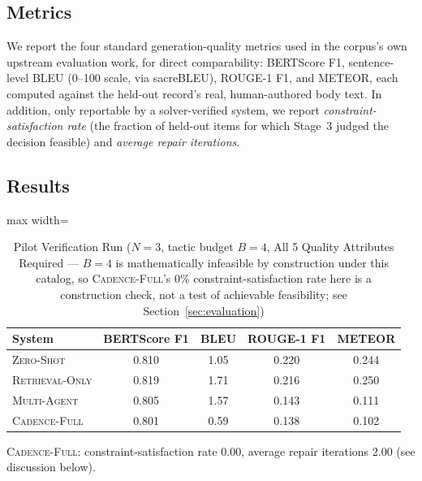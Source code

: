 \documentclass[preprint,12pt,authoryear]{elsarticle}
\newcommand{\sysZS}{\textsc{Zero-Shot}}
\newcommand{\sysRO}{\textsc{Retrieval-Only}}
\newcommand{\sysMA}{\textsc{Multi-Agent}}
\newcommand{\sysFull}{\textsc{Cadence-Full}}
\renewcommand{\_}{\textunderscore\allowbreak{}}
\begin{document}
\subsection{Metrics}

We report the four standard generation-quality metrics used in the corpus's own upstream evaluation work, for direct comparability: BERTScore F1, sentence-level BLEU (0--100 scale, via sacreBLEU), ROUGE-1 F1, and METEOR, each computed against the held-out record's real, human-authored body text. In addition, only reportable by a solver-verified system, we report \emph{constraint-satisfaction rate} (the fraction of held-out items for which Stage~3 judged the decision feasible) and \emph{average repair iterations}.

\subsection{Results}

\begin{table}[!htbp]
\caption{Pilot Verification Run ($N=3$, tactic budget $B=4$, All 5 Quality Attributes Required --- $B=4$ is mathematically infeasible by construction under this catalog, so \sysFull{}'s 0\% constraint-satisfaction rate here is a construction check, not a test of achievable feasibility; see Section~\ref{sec:evaluation})\label{tab:pilot}}
\centering
\begin{adjustbox}{max width=\textwidth}
\begin{tabular}{@{}lcccc@{}}
\toprule
System & BERTScore F1 & BLEU & ROUGE-1 F1 & METEOR \\
\midrule
\sysZS{}            & 0.810 & 1.05 & 0.220 & 0.244 \\
\sysRO{}       & 0.819 & 1.71 & 0.216 & 0.250 \\
\sysMA{}& 0.805 & 1.57 & 0.143 & 0.111 \\
\sysFull{}         & 0.801 & 0.59 & 0.138 & 0.102 \\
\bottomrule
\end{tabular}
\end{adjustbox}

\vspace{2pt}
\footnotesize \sysFull{}: constraint-satisfaction rate 0.00, average repair iterations 2.00 (see discussion below).
\end{table}
\FloatBarrier
\end{document}
